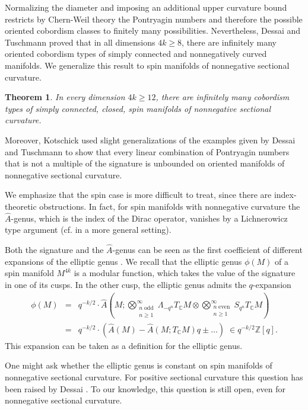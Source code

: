 \documentclass[10pt,a4paper]{amsart}
\theoremstyle{thm}
\newtheorem{thm}{Theorem}[section]
\theoremstyle{text}
\begin{document}
Normalizing the diameter and imposing an additional upper curvature bound restricts by Chern-Weil theory the Pontryagin numbers and therefore the possible oriented cobordism classes to finitely many possibilities. Nevertheless, Dessai and Tuschmann \cite{DW07} proved  that in all dimensions $4k\geq8$, there are infinitely many oriented cobordism types of simply connected and nonnegatively curved manifolds. We generalize this result to spin manifolds of nonnegative sectional curvature.

\begin{thm} \label{infinite cobordism type}
In every dimension $4k \geq 12$, there are infinitely many cobordism types of simply connected, closed, spin manifolds of nonnegative sectional curvature.
\end{thm}

Moreover, Kotschick \cite{Kot10} used slight generalizations of the examples given by Dessai and Tuschmann to show that every linear combination of Pontryagin numbers that is not a multiple of the signature is unbounded on oriented manifolds of nonnegative sectional curvature. 

We emphasize that the spin case is more difficult to treat, since there are index-theoretic obstructions. In fact, for spin manifolds with nonnegative curvature the $\hat{A}$-genus, which is the index of the Dirac operator,  vanishes by a Lichnerowicz type argument (cf. \cite{Lott00} in a more general setting).

Both the signature and the $\hat{A}$-genus can be seen as the first coefficient of different expansions of the elliptic genus \cite{HBJ92}. We recall that the elliptic genus $\phi(M)$ of a spin manifold $M^{4k}$ is a modular function, which takes the value of the signature in one of its cusps. In the other cusp, the elliptic genus admits the $q$-expansion
\begin{eqnarray*}
\phi(M) &=& q^{-k/2} \cdot \hat{A}(M; \bigotimes_{\substack{n \; \textrm{odd} \\ n \geq 1}}^{\infty}\Lambda_{-q^n} T_{\mathbb{C}}M \otimes \bigotimes_{\substack{n \; \textrm{even} \\ n \geq 1}}^{\infty} S_{q^n} T_{\mathbb{C}}M) \\
 &=& q^{-k/2} \cdot (\hat{A}(M) - \hat{A}(M; T_{\mathbb{C}} M) q \pm \ldots ) \; \in q^{-k/2} {\mathbb{Z}}[q].
\end{eqnarray*}
This expansion can be taken as a definition for the elliptic genus. 

One might ask whether the elliptic genus is constant on spin manifolds of nonnegative  sectional curvature.  For positive sectional curvature this question has been raised by Dessai \cite{Des07}. To our knowledge, this question is  still open, even for nonnegative sectional curvature.
\end{document}
